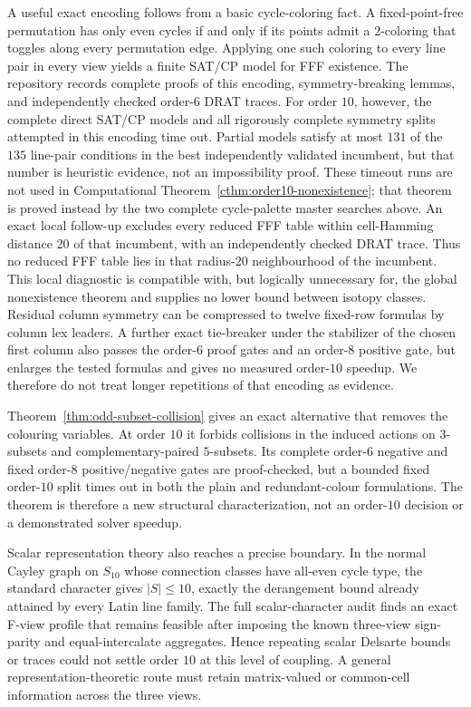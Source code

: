 A useful exact encoding follows from a basic cycle-coloring fact.  A
fixed-point-free permutation has only even cycles if and only if its points
admit a $2$-coloring that toggles along every permutation edge.  Applying one
such coloring to every line pair in every view yields a finite SAT/CP model
for FFF existence.  The repository records complete proofs of this encoding,
symmetry-breaking lemmas, and independently checked order-$6$ DRAT traces.
For order $10$, however, the complete direct SAT/CP models and all rigorously
complete symmetry splits attempted in this encoding time out.  Partial models
satisfy at most $131$ of the $135$ line-pair conditions in the best
independently validated incumbent, but that number is heuristic evidence, not
an impossibility proof.  These timeout runs are not used in Computational
Theorem~\ref{cthm:order10-nonexistence}; that theorem is proved instead by the
two complete cycle-palette master searches above.
An exact local follow-up excludes every reduced FFF table within cell-Hamming
distance $20$ of that incumbent, with an independently checked DRAT trace.
Thus no reduced FFF table lies in that radius-$20$ neighbourhood of the
incumbent.  This local diagnostic is compatible with, but logically unnecessary
for, the global nonexistence theorem and supplies no lower bound between
isotopy classes.
Residual column symmetry can be compressed to twelve fixed-row formulas by
column lex leaders.  A further exact tie-breaker under the stabilizer of the
chosen first column also passes the order-$6$ proof gates and an order-$8$
positive gate, but enlarges the tested formulas and gives no measured
order-$10$ speedup.  We therefore do not treat longer repetitions of that
encoding as evidence.

Theorem~\ref{thm:odd-subset-collision} gives an exact alternative that removes
the colouring variables.  At order $10$ it forbids collisions in the induced
actions on $3$-subsets and complementary-paired $5$-subsets.  Its complete
order-$6$ negative and fixed order-$8$ positive/negative gates are
proof-checked, but a bounded fixed order-$10$ split times out in both the
plain and redundant-colour formulations.  The theorem is therefore a new
structural characterization, not an order-$10$ decision or a demonstrated
solver speedup.

Scalar representation theory also reaches a precise boundary.  In the normal
Cayley graph on $S_{10}$ whose connection classes have all-even cycle type,
the standard character gives $|S|\leq10$, exactly the derangement bound
already attained by every Latin line family.  The full scalar-character audit
finds an exact F-view profile that remains feasible after imposing the known
three-view sign-parity and equal-intercalate aggregates.  Hence repeating
scalar Delsarte bounds or traces could not settle order $10$ at this level of
coupling.  A general representation-theoretic route must retain
matrix-valued or common-cell information across the three views.

